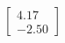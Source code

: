 \documentclass[preview]{standalone}
\begin{document}
\begin{align*}
\begin{bmatrix} 4.17 \\ -2.50 \end{bmatrix}
\end{align*}
\end{document}
